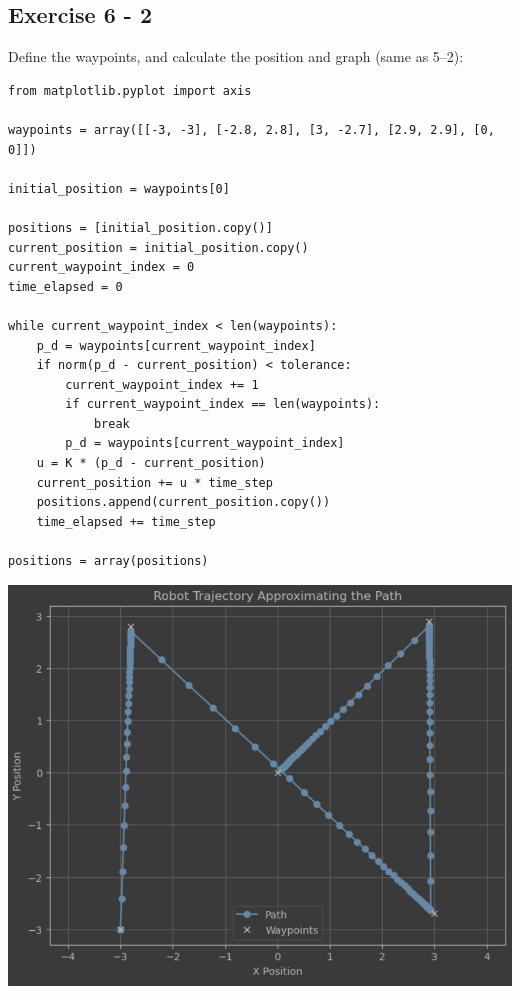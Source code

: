 \documentclass[letterpaper, 10 pt, conference]{ieeeconf}  %
\begin{document}
    \subsection{Exercise 6 - 2}

    Define the waypoints, and calculate the position and graph (same as 5--2):

    \begin{lstlisting}[label={lst:lstlisting2}]
from matplotlib.pyplot import axis

waypoints = array([[-3, -3], [-2.8, 2.8], [3, -2.7], [2.9, 2.9], [0, 0]])

initial_position = waypoints[0]

positions = [initial_position.copy()]
current_position = initial_position.copy()
current_waypoint_index = 0
time_elapsed = 0

while current_waypoint_index < len(waypoints):
    p_d = waypoints[current_waypoint_index]
    if norm(p_d - current_position) < tolerance:
        current_waypoint_index += 1
        if current_waypoint_index == len(waypoints):
            break
        p_d = waypoints[current_waypoint_index]
    u = K * (p_d - current_position)
    current_position += u * time_step
    positions.append(current_position.copy())
    time_elapsed += time_step

positions = array(positions)
    \end{lstlisting}

    \begin{center}
        \includegraphics[scale=0.4]{1-2}
    \end{center}
\end{document}

